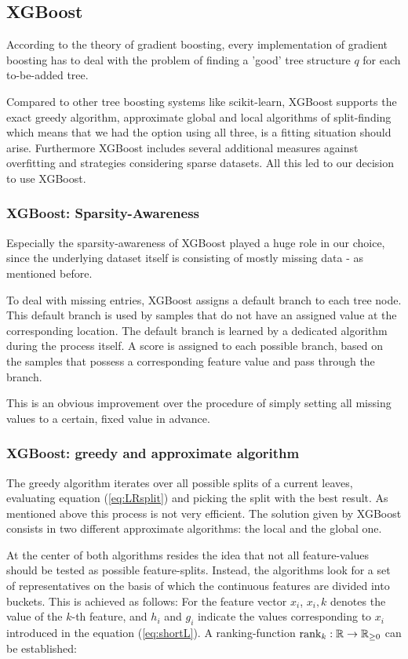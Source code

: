 \subsection{XGBoost}\label{subsec:xgb}

According to the theory of gradient boosting, every implementation of gradient boosting has to deal with the problem of finding a 'good' tree structure $q$ for each to-be-added tree.

Compared to other tree boosting systems like scikit-learn, XGBoost supports the exact greedy algorithm, approximate global and local algorithms of split-finding which means that we had the option using all three, is a fitting situation should arise. Furthermore XGBoost includes several additional measures against overfitting and strategies considering sparse datasets. All this led to our decision to use XGBoost.

\subsubsection{XGBoost: Sparsity-Awareness}

Especially the sparsity-awareness of XGBoost played a huge role in our choice, since the underlying dataset itself is consisting of mostly missing data - as mentioned before.

To deal with missing entries, XGBoost assigns a default branch to each tree node. This default branch is used by samples that do not have an assigned value at the corresponding location. The default branch is learned by a dedicated algorithm during the process itself. A score is assigned to each possible branch, based on the samples that possess a corresponding feature value and pass through the branch.

This is an obvious improvement over the procedure of simply setting all missing values to a certain, fixed value in advance.

\subsubsection{XGBoost: greedy and approximate algorithm}
The greedy algorithm iterates over all possible splits of a current leaves, evaluating equation (\ref{eq:LRsplit}) and picking the split with the best result. As mentioned above this process is not very efficient. The solution given by XGBoost consists in two different approximate algorithms: the local and the global one.

\newcommand{\rnk}{\operatorname{rank}}
At the center of both algorithms resides the idea that not all feature-values should be tested as possible feature-splits. Instead, the algorithms look for a set of representatives on the basis of which the continuous features are divided into buckets. This is achieved as follows: For the feature vector $x_i$, $x_i,k$ denotes the value of the $k$-th feature, and $h_i$ and $g_i$ indicate the values corresponding to $x_i$ introduced in the equation (\ref{eq:shortL}).
A ranking-function $\rnk_k : \R\to \R_{\geq 0}$ can be established:

